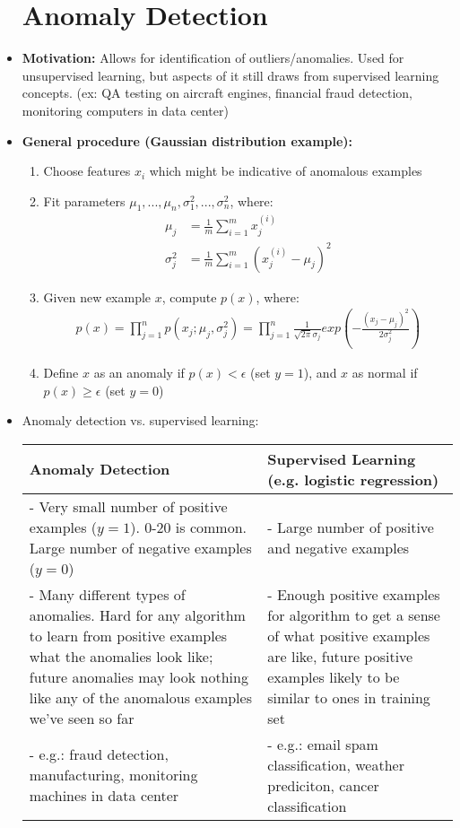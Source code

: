 \documentclass[titlepage]{article}
\begin{document}
\begin{itemize}
\section{Anomaly Detection}
\item \textbf{Motivation:} Allows for identification of outliers/anomalies. Used for unsupervised learning, but aspects of it still draws from supervised learning concepts. (ex: QA testing on aircraft engines, financial fraud detection, monitoring computers in data center)
\item \textbf{General procedure (Gaussian distribution example):}
\begin{enumerate}
	\item Choose features $x_i$ which might be indicative of anomalous examples
	\item Fit parameters $\mu_1,...,\mu_n, \sigma_1^2,...,\sigma_n^2$, where:
	\begin{align*}
		\mu_j &= \frac{1}{m} \sum_{i=1}^{m} x_j^{(i)}\\
		\sigma_j^2 &= \frac{1}{m} \sum_{i=1}^{m} (x_j^{(i)} -\mu_j)^2
	\end{align*}
	\item Given new example $x$, compute $p(x)$, where:
	\begin{align*}
		p(x) = \prod_{j=1}^n p(x_j; \mu_j, \sigma_j^2) = \prod_{j=1}^n \frac{1}{\sqrt{2\pi}\sigma_j}
		exp(-\frac{(x_j-\mu_j)^2}{2\sigma_j^2})
	\end{align*}
	\item Define $x$ as an anomaly if $p(x) < \epsilon$ (set $y=1$), and $x$ as normal if $p(x) \geq \epsilon$ (set $y=0$)
\end{enumerate}

\item Anomaly detection vs. supervised learning:
\begin{table} [h]
	\centering
	\begin{tabular}{p{8cm}|p{8cm}}
		
		\textbf{Anomaly Detection} & \textbf{Supervised Learning (e.g. logistic regression)}\\
		\hline
		- Very small number of positive examples ($y=1$). 0-20 is common. Large number of negative examples ($y=0$) & - Large number of positive and negative examples \\
		- Many different types of anomalies. Hard for any algorithm to learn from positive examples what the anomalies look like; future anomalies may look nothing like any of the anomalous examples we've seen so far & - Enough positive examples for algorithm to get a sense of what positive examples are like, future positive examples likely to be similar to ones in training set\\
		- e.g.: fraud detection, manufacturing, monitoring machines in data center & - e.g.: email spam classification, weather prediciton, cancer classification\\
		

\end{tabular}
\end{table}
\end{itemize}
\end{document}

